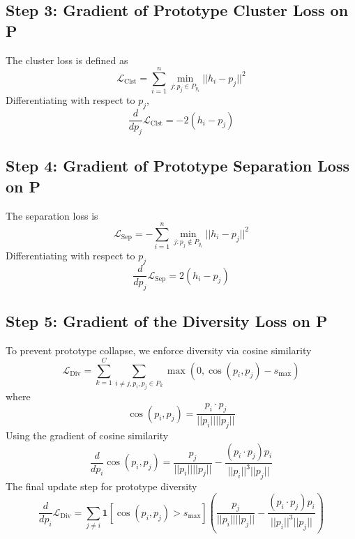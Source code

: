 \documentclass[12pt]{article}
\begin{document}
\subsection*{Step 3: Gradient of Prototype Cluster Loss on P}
The cluster loss is defined as
\begin{equation*}
    \mathcal{L}_{\text{Clst}} = \sum_{i=1}^{n} \min_{j:p_j \in P_{y_i}} ||h_i - p_j||^2
\end{equation*}
Differentiating with respect to $p_j$,
\begin{equation*}
    \frac{d}{dp_j} \mathcal{L}_{\text{Clst}} = -2(h_i - p_j)
\end{equation*}

\subsection*{Step 4: Gradient of Prototype Separation Loss  on P}
The separation loss is
\begin{equation*}
    \mathcal{L}_{\text{Sep}} = - \sum_{i=1}^{n} \min_{j:p_j \notin P_{y_i}} ||h_i - p_j||^2
\end{equation*}
Differentiating with respect to $p_j$
\begin{equation*}
    \frac{d}{dp_j} \mathcal{L}_{\text{Sep}} = 2(h_i - p_j)
\end{equation*}

\subsection*{Step 5: Gradient of the Diversity Loss  on P}
To prevent prototype collapse, we enforce diversity via cosine similarity
\begin{equation*}
    \mathcal{L}_{\text{Div}} = \sum_{k=1}^{C} \sum_{i \neq j, p_i, p_j \in P_k} \max(0, \cos(p_i, p_j) - s_{\max})
\end{equation*}
where
\begin{equation*}
    \cos(p_i, p_j) = \frac{p_i \cdot p_j}{||p_i|| ||p_j||}
\end{equation*}
Using the gradient of cosine similarity
\begin{equation*}
    \frac{d}{dp_i} \cos(p_i, p_j) = \frac{p_j}{||p_i|| ||p_j||} - \frac{(p_i \cdot p_j) p_i}{||p_i||^3 ||p_j||}
\end{equation*}
The final update step for prototype diversity
\begin{equation*}
    \frac{d}{dp_i} \mathcal{L}_{\text{Div}} = \sum_{j \neq i} \mathbf{1}[\cos(p_i, p_j) > s_{\max}] \left( \frac{p_j}{||p_i|| ||p_j||} - \frac{(p_i \cdot p_j) p_i}{||p_i||^3 ||p_j||} \right)
\end{equation*}
\end{document}
